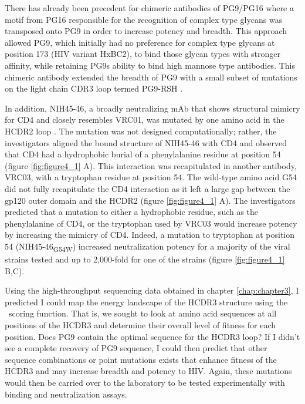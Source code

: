 There has already been precedent for chimeric antibodies of PG9/PG16 where a motif from PG16 responsible for the recognition of complex type glycans was transposed onto PG9 in order to increase potency and breadth. This approach allowed PG9, which initially had no preference for complex type glycans at position 173 (HIV variant HxBC2), to bind those glycan types with stronger affinity, while retaining PG9s ability to bind high mannose type antibodies. This chimeric antibody extended the breadth of PG9 with a small subset of mutations on the light chain CDR3 loop termed PG9-RSH \citep{Pancera:2013ev}.

In addition, NIH45-46, a broadly neutralizing mAb that shows structural mimicry for CD4 and closely resembles VRC01, was mutated by one amino acid in the HCDR2 loop \citep{Scheid:2011js,Diskin:2011hl}. The mutation was not designed computationally; rather, the investigators aligned the bound structure of NIH45-46 with CD4 and observed that CD4 had a hydrophobic burial of a phenylalanine residue at position 54 (figure \ref{fig:figure4_1} A). This interaction was recapitulated in another antibody, VRC03, with a tryptophan residue at position 54. The wild-type amino acid G54 did not fully recapitulate the CD4 interaction as it left a large gap between the gp120 outer domain and the HCDR2 (figure \ref{fig:figure4_1} A). The investigators predicted that a mutation to either a hydrophobic residue, such as the phenylalanine of CD4, or the tryptophan used by VRC03 would increase potency by increasing the mimicry of CD4. Indeed, a mutation to tryptophan at position 54 (NIH45-46\textsubscript{G54W}) increased neutralization potency for a majority of the viral strains tested and up to 2,000-fold for one of the strains (figure \ref{fig:figure4_1} B,C).

Using the high-throughput sequencing data obtained in chapter \ref{chap:chapter3}, I predicted I could map the energy landscape of the HCDR3 structure using the \rosetta~scoring function. That is, we sought to look at amino acid sequences at all positions of the HCDR3 and determine their overall level of fitness for each position. Does PG9 contain the optimal sequence for the HCDR3 loop? If I didn't see a complete recovery of PG9 sequence, I could then predict that other sequence combinations or point mutations exists that enhance fitness of the HCDR3 and may increase breadth and potency to HIV. Again, these mutations would then be carried over to the laboratory to be tested experimentally with binding and neutralization assays.

